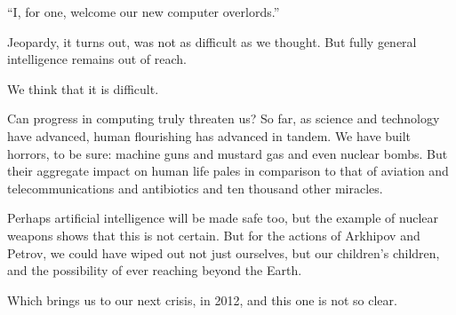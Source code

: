 \documentclass{article}
\begin{document}
	``I, for one, welcome our new computer overlords.''

Jeopardy, it turns out, was not as difficult as we thought. But fully general
intelligence remains out of reach.

We think that it is difficult.

\divider

Can progress in computing truly threaten us? So far, as science and technology
have advanced, human flourishing has advanced in tandem. We have built horrors,
to be sure: machine guns and mustard gas and even nuclear bombs. But their
aggregate impact on human life pales in comparison to that of aviation and
telecommunications and antibiotics and ten thousand other miracles.

Perhaps artificial intelligence will be made safe too, but the example of
nuclear weapons shows that this is not certain. But for the actions of Arkhipov
and Petrov, we could have wiped out not just ourselves, but our children's
children, and the possibility of ever reaching beyond the Earth. 

Which brings us to our next crisis, in 2012, and this one is not so clear.


\end{document}
